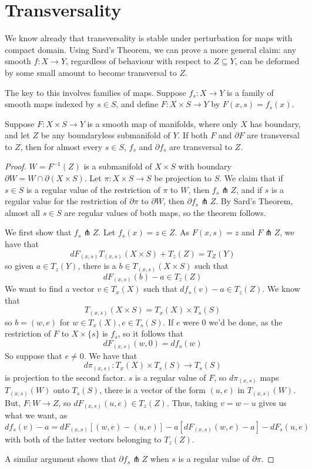 \section{Transversality}

We know already that transversality is stable under perturbation for maps with compact domain. Using Sard's Theorem, we can prove a more general claim: any smooth $f: X \to Y$, regardless of behaviour with respect to $Z \subseteq Y$, can be deformed by some small amount to become transversal to $Z$. 

The key to this involves families of maps. Suppose $f_s: X \to Y$ is a family of smooth maps indexed by $s \in S$, and define $F: X \times S \to Y$ by $F(x,s) = f_s(x)$. 

\begin{theorem}
    Suppose $F: X \times S \to Y$ is a smooth map of manifolds, where only $X$ has boundary, and let $Z$ be any boundaryless submanifold of $Y$. If both $F$ and $\partial F$ are transversal to $Z$, then for almost every $s \in S$, $f_s$ and $\partial f_s$ are transversal to $Z$.
\end{theorem}

\begin{proof}
    $W = F^{-1}(Z)$ is a submanifold of $X \times S$ with boundary $\partial W = W \cap \partial(X \times S)$. Let $\pi: X \times S \to S$ be projection to $S$. We claim that if $s \in S$ is a regular value of the restriction of $\pi$ to $W$, then $f_s \pitchfork Z$, and if $s$ is a regular value for the restriction of $\partial \pi$ to $\partial W$, then $\partial f_s \pitchfork Z$. By Sard's Theorem, almost all $s \in S$ are regular values of both maps, so the theorem follows. 
    
    We first show that $f_s \pitchfork Z$. Let $f_s(x) = z \in Z$. As $F(x,s) = z$ and $F \pitchfork Z$, we have that 
    \[dF_{(x,s)}T_{(x,s)}(X \times S) + T_z(Z) = T_Z(Y)\]
    so given $a \in T_z(Y)$, there is a $b \in T_{(x,s)}(X \times S)$ such that 
    \[dF_{(x,s)}(b) - a \in T_z(Z)\]
    We want to find a vector $v \in T_x(X)$ such that $df_s(v) - a \in T_z(Z)$. We know that 
    \[T_{(x,s)}(X \times S) = T_x(X) \times T_s(S)\]
    so $b = (w,e)$ for $w \in T_x(X), e \in T_s(S)$. If $e$ were 0 we'd be done, as the restriction of $F$ to $X \times \{s\}$ is $f_s$, so it follows that 
    \[dF_{(x,s)}(w,0) = df_s(w)\]
    So suppose that $e \neq 0$. We have that 
    \[d\pi_{(x,s)}: T_x(X) \times T_s(S) \to T_s(S)\]
    is projection to the second factor. $s$ is a regular value of $F$, so $d\pi_{(x,s)}$ maps $T_{(x,s)}(W)$ onto $T_s(S)$, there is a vector of the form $(u,e)$ in $T_{(x,s)}(W)$. But, $F: W \to Z$, so $dF_{(x,s)}(u,e) \in T_z(Z)$. Thus, taking $v = w - u$ gives us what we want, as 
    \[df_s(v) - a = dF_{(x,s)}[(w,e) - (u,e)] - a [dF_{(x,s)}(w,e) - a] - dF_s(u,e)\]
    with both of the latter vectors belonging to $T_z(Z)$. 

    A similar argument shows that $\partial f_s \pitchfork Z$ when $s$ is a regular value of $\partial \pi$. 
\end{proof}

